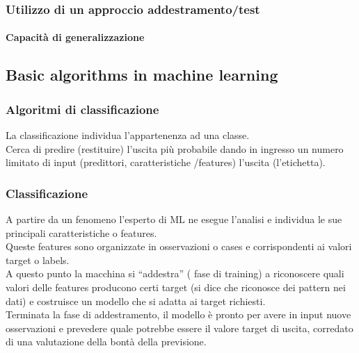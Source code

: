 \documentclass[../main.tex]{subfiles}
\begin{document}
	\subsubsection{Utilizzo di un approccio addestramento/test}
	\paragraph{Capacità di generalizzazione}
	\subsection{Basic algorithms in machine learning}
	\subsubsection{Algoritmi di classificazione}
	La classificazione individua l'appartenenza ad una classe. \\
	Cerca di predire (restituire) l'uscita più probabile dando in ingresso un numero limitato di input (predittori, caratteristiche /features) l'uscita (l'etichetta).
	\subsubsection{Classificazione}
	A partire da un fenomeno l'esperto di ML ne esegue l'analisi e individua le sue principali caratteristiche o features. \\
	Queste features sono organizzate in osservazioni o cases e corrispondenti ai valori target o labels. \\
	A questo punto la macchina si “addestra” ( fase di training) a riconoscere quali valori delle features producono certi target (si dice che riconosce dei pattern nei dati) e costruisce un modello che si adatta ai target richiesti. \\
	Terminata la fase di addestramento, il modello è pronto per avere in input nuove osservazioni e prevedere quale potrebbe essere il valore target di uscita, corredato di una valutazione della bontà della previsione.
\end{document}
